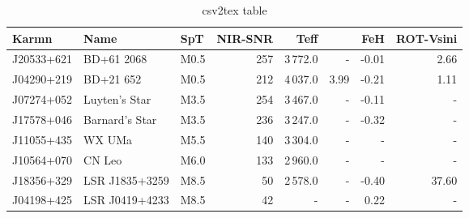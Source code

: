 
\begin{table}[h]
    \caption{csv2tex table}
    \begin{tabular}{lllrrrrr}
        \toprule
        Karmn &            Name &   SpT &  NIR-{SNR} &    Teff & \logg{} &   FeH &  ROT-Vsini \\
        \midrule
        J20533+621 &      BD+61 2068 &  M0.5 &      257 &  3\,772.0 &     - & -0.01 &       2.66 \\
        J04290+219 &       BD+21 652 &  M0.5 &      212 &  4\,037.0 &  3.99 & -0.21 &       1.11 \\
        J07274+052 &   Luyten's Star &  M3.5 &      254 &  3\,467.0 &     - & -0.11 &          - \\
        J17578+046 &  Barnard's Star &  M3.5 &      236 &  3\,247.0 &     - & -0.32 &          - \\
        J11055+435 &          WX UMa &  M5.5 &      140 &  3\,304.0 &     - &     - &          - \\
        J10564+070 &          CN Leo &  M6.0 &      133 &  2\,960.0 &     - &     - &          - \\
        J18356+329 &  LSR J1835+3259 &  M8.5 &       50 &  2\,578.0 &     - & -0.40 &      37.60 \\
        J04198+425 &  LSR J0419+4233 &  M8.5 &       42 &       - &     - &  0.22 &          - \\
    \bottomrule
    \end{tabular}\label{tab:carmenes_selection}
\end{table}
